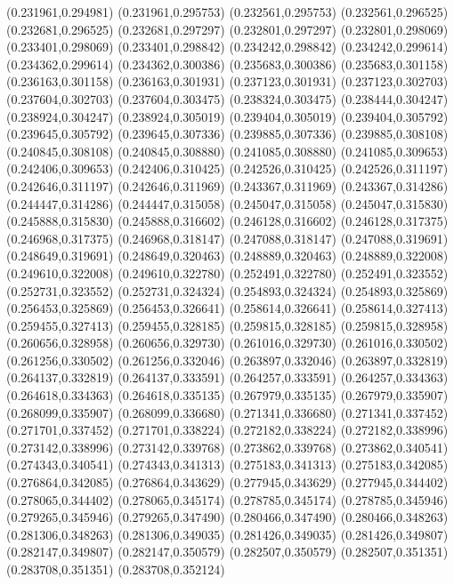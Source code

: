(0.231961,0.294981)
(0.231961,0.295753)
(0.232561,0.295753)
(0.232561,0.296525)
(0.232681,0.296525)
(0.232681,0.297297)
(0.232801,0.297297)
(0.232801,0.298069)
(0.233401,0.298069)
(0.233401,0.298842)
(0.234242,0.298842)
(0.234242,0.299614)
(0.234362,0.299614)
(0.234362,0.300386)
(0.235683,0.300386)
(0.235683,0.301158)
(0.236163,0.301158)
(0.236163,0.301931)
(0.237123,0.301931)
(0.237123,0.302703)
(0.237604,0.302703)
(0.237604,0.303475)
(0.238324,0.303475)
(0.238444,0.304247)
(0.238924,0.304247)
(0.238924,0.305019)
(0.239404,0.305019)
(0.239404,0.305792)
(0.239645,0.305792)
(0.239645,0.307336)
(0.239885,0.307336)
(0.239885,0.308108)
(0.240845,0.308108)
(0.240845,0.308880)
(0.241085,0.308880)
(0.241085,0.309653)
(0.242406,0.309653)
(0.242406,0.310425)
(0.242526,0.310425)
(0.242526,0.311197)
(0.242646,0.311197)
(0.242646,0.311969)
(0.243367,0.311969)
(0.243367,0.314286)
(0.244447,0.314286)
(0.244447,0.315058)
(0.245047,0.315058)
(0.245047,0.315830)
(0.245888,0.315830)
(0.245888,0.316602)
(0.246128,0.316602)
(0.246128,0.317375)
(0.246968,0.317375)
(0.246968,0.318147)
(0.247088,0.318147)
(0.247088,0.319691)
(0.248649,0.319691)
(0.248649,0.320463)
(0.248889,0.320463)
(0.248889,0.322008)
(0.249610,0.322008)
(0.249610,0.322780)
(0.252491,0.322780)
(0.252491,0.323552)
(0.252731,0.323552)
(0.252731,0.324324)
(0.254893,0.324324)
(0.254893,0.325869)
(0.256453,0.325869)
(0.256453,0.326641)
(0.258614,0.326641)
(0.258614,0.327413)
(0.259455,0.327413)
(0.259455,0.328185)
(0.259815,0.328185)
(0.259815,0.328958)
(0.260656,0.328958)
(0.260656,0.329730)
(0.261016,0.329730)
(0.261016,0.330502)
(0.261256,0.330502)
(0.261256,0.332046)
(0.263897,0.332046)
(0.263897,0.332819)
(0.264137,0.332819)
(0.264137,0.333591)
(0.264257,0.333591)
(0.264257,0.334363)
(0.264618,0.334363)
(0.264618,0.335135)
(0.267979,0.335135)
(0.267979,0.335907)
(0.268099,0.335907)
(0.268099,0.336680)
(0.271341,0.336680)
(0.271341,0.337452)
(0.271701,0.337452)
(0.271701,0.338224)
(0.272182,0.338224)
(0.272182,0.338996)
(0.273142,0.338996)
(0.273142,0.339768)
(0.273862,0.339768)
(0.273862,0.340541)
(0.274343,0.340541)
(0.274343,0.341313)
(0.275183,0.341313)
(0.275183,0.342085)
(0.276864,0.342085)
(0.276864,0.343629)
(0.277945,0.343629)
(0.277945,0.344402)
(0.278065,0.344402)
(0.278065,0.345174)
(0.278785,0.345174)
(0.278785,0.345946)
(0.279265,0.345946)
(0.279265,0.347490)
(0.280466,0.347490)
(0.280466,0.348263)
(0.281306,0.348263)
(0.281306,0.349035)
(0.281426,0.349035)
(0.281426,0.349807)
(0.282147,0.349807)
(0.282147,0.350579)
(0.282507,0.350579)
(0.282507,0.351351)
(0.283708,0.351351)
(0.283708,0.352124)

